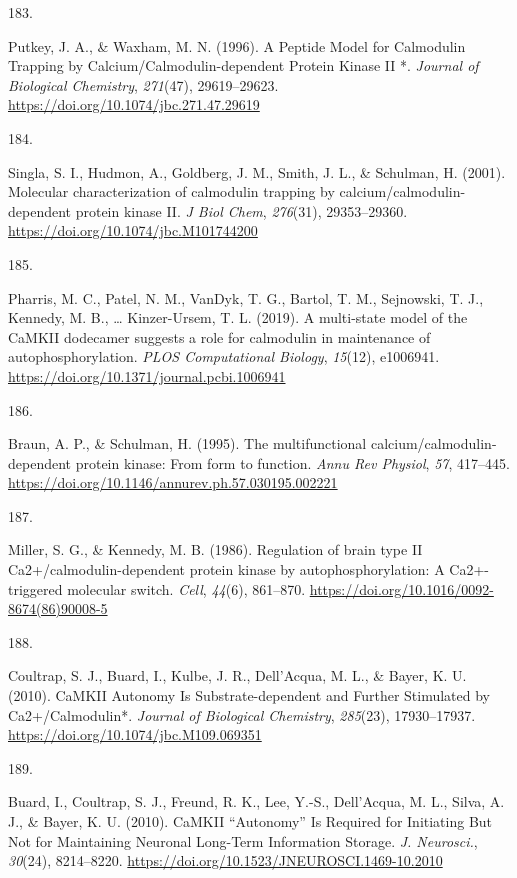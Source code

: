 \documentclass[
  11pt,
  letterpaper,
]{scrreprt}
\newlength{\cslhangindent}
\newlength{\csllabelwidth}
\newenvironment{CSLReferences}[2] %
 {\begin{list}{}{%
  \setlength{\itemindent}{0pt}
  \setlength{\leftmargin}{0pt}
  \setlength{\parsep}{0pt}
  \ifodd #1
   \setlength{\leftmargin}{\cslhangindent}
   \setlength{\itemindent}{-1\cslhangindent}
  \fi
  \setlength{\itemsep}{#2\baselineskip}}}
 {\end{list}}
\newcommand{\CSLLeftMargin}[1]{\parbox[t]{\csllabelwidth}{\strut#1\strut}}
\newcommand{\CSLRightInline}[1]{\parbox[t]{\linewidth - \csllabelwidth}{\strut#1\strut}}
\begin{document}
\begin{CSLReferences}{0}{0}
\CSLLeftMargin{183. }%
\CSLRightInline{Putkey, J. A., \& Waxham, M. N. (1996). A {Peptide
Model} for {Calmodulin Trapping} by {Calcium}/{Calmodulin-dependent
Protein Kinase II} *. \emph{Journal of Biological Chemistry},
\emph{271}(47), 29619--29623.
\url{https://doi.org/10.1074/jbc.271.47.29619}}

\CSLLeftMargin{184. }%
\CSLRightInline{Singla, S. I., Hudmon, A., Goldberg, J. M., Smith, J.
L., \& Schulman, H. (2001). Molecular characterization of calmodulin
trapping by calcium/calmodulin-dependent protein kinase {II}. \emph{J
Biol Chem}, \emph{276}(31), 29353--29360.
\url{https://doi.org/10.1074/jbc.M101744200}}

\CSLLeftMargin{185. }%
\CSLRightInline{Pharris, M. C., Patel, N. M., VanDyk, T. G., Bartol, T.
M., Sejnowski, T. J., Kennedy, M. B., \ldots{} Kinzer-Ursem, T. L.
(2019). A multi-state model of the {CaMKII} dodecamer suggests a role
for calmodulin in maintenance of autophosphorylation. \emph{PLOS
Computational Biology}, \emph{15}(12), e1006941.
\url{https://doi.org/10.1371/journal.pcbi.1006941}}

\CSLLeftMargin{186. }%
\CSLRightInline{Braun, A. P., \& Schulman, H. (1995). The
multifunctional calcium/calmodulin-dependent protein kinase: From form
to function. \emph{Annu Rev Physiol}, \emph{57}, 417--445.
\url{https://doi.org/10.1146/annurev.ph.57.030195.002221}}

\CSLLeftMargin{187. }%
\CSLRightInline{Miller, S. G., \& Kennedy, M. B. (1986). Regulation of
brain type {II Ca2}+/calmodulin-dependent protein kinase by
autophosphorylation: A {Ca2}+-triggered molecular switch. \emph{Cell},
\emph{44}(6), 861--870.
\url{https://doi.org/10.1016/0092-8674(86)90008-5}}

\CSLLeftMargin{188. }%
\CSLRightInline{Coultrap, S. J., Buard, I., Kulbe, J. R., Dell'Acqua, M.
L., \& Bayer, K. U. (2010). {CaMKII Autonomy Is Substrate-dependent} and
{Further Stimulated} by {Ca2}+/{Calmodulin}*. \emph{Journal of
Biological Chemistry}, \emph{285}(23), 17930--17937.
\url{https://doi.org/10.1074/jbc.M109.069351}}

\CSLLeftMargin{189. }%
\CSLRightInline{Buard, I., Coultrap, S. J., Freund, R. K., Lee, Y.-S.,
Dell'Acqua, M. L., Silva, A. J., \& Bayer, K. U. (2010). {CaMKII}
{``{Autonomy}''} {Is Required} for {Initiating But Not} for {Maintaining
Neuronal Long-Term Information Storage}. \emph{J. Neurosci.},
\emph{30}(24), 8214--8220.
\url{https://doi.org/10.1523/JNEUROSCI.1469-10.2010}}


\end{CSLReferences}
\end{document}
